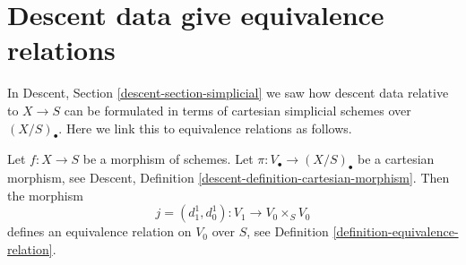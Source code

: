 \section{Descent data give equivalence relations}
\label{section-equivalence-relation}

\noindent
In Descent, Section \ref{descent-section-simplicial} we saw how descent
data relative to $X \to S$ can be formulated in terms of cartesian simplicial
schemes over $(X/S)_\bullet$. Here we link this to equivalence
relations as follows.

\begin{lemma}
\label{lemma-equivalence-relation}
Let $f : X \to S$ be a morphism of schemes.
Let $\pi : V_\bullet \to (X/S)_\bullet$ be a cartesian morphism,
see Descent, Definition \ref{descent-definition-cartesian-morphism}.
Then the morphism
$$
j = (d^1_1, d^1_0) : V_1 \to V_0 \times_S V_0
$$
defines an equivalence relation on $V_0$ over $S$,
see Definition \ref{definition-equivalence-relation}.
\end{lemma}

